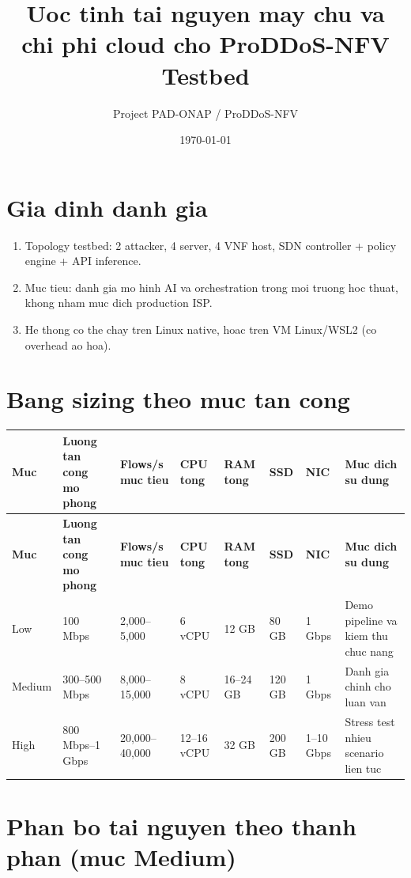 \documentclass[12pt,a4paper]{article}
\title{Uoc tinh tai nguyen may chu va chi phi cloud cho ProDDoS-NFV Testbed}
\author{Project PAD-ONAP / ProDDoS-NFV}
\date{\today}
\begin{document}
\maketitle

\section{Gia dinh danh gia}

\begin{enumerate}
	\item Topology testbed: 2 attacker, 4 server, 4 VNF host, SDN controller + policy engine + API inference.
	\item Muc tieu: danh gia mo hinh AI va orchestration trong moi truong hoc thuat, khong nham muc dich production ISP.
	\item He thong co the chay tren Linux native, hoac tren VM Linux/WSL2 (co overhead ao hoa).
\end{enumerate}

\section{Bang sizing theo muc tan cong}

\begin{longtable}{p{2.4cm} p{2.8cm} p{2.6cm} p{1.8cm} p{1.8cm} p{1.8cm} p{2.1cm} p{3.0cm}}
\toprule
\textbf{Muc} & \textbf{Luong tan cong mo phong} & \textbf{Flows/s muc tieu} & \textbf{CPU tong} & \textbf{RAM tong} & \textbf{SSD} & \textbf{NIC} & \textbf{Muc dich su dung} \\
\midrule
\endfirsthead

\toprule
\textbf{Muc} & \textbf{Luong tan cong mo phong} & \textbf{Flows/s muc tieu} & \textbf{CPU tong} & \textbf{RAM tong} & \textbf{SSD} & \textbf{NIC} & \textbf{Muc dich su dung} \\
\midrule
\endhead

Low & 100 Mbps & 2,000--5,000 & 6 vCPU & 12 GB & 80 GB & 1 Gbps & Demo pipeline va kiem thu chuc nang \\
Medium & 300--500 Mbps & 8,000--15,000 & 8 vCPU & 16--24 GB & 120 GB & 1 Gbps & Danh gia chinh cho luan van \\
High & 800 Mbps--1 Gbps & 20,000--40,000 & 12--16 vCPU & 32 GB & 200 GB & 1--10 Gbps & Stress test nhieu scenario lien tuc \\

\bottomrule
\end{longtable}

\section{Phan bo tai nguyen theo thanh phan (muc Medium)}
\end{document}
